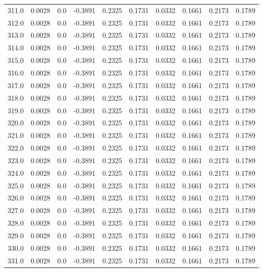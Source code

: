 \begin{longtable}{lrrrrrrrrr}
311.0 & 0.0028 & 0.0 & -0.3891 & 0.2325 & 0.1731 & 0.0332 & 0.1661 & 0.2173 & 0.1789 \\
312.0 & 0.0028 & 0.0 & -0.3891 & 0.2325 & 0.1731 & 0.0332 & 0.1661 & 0.2173 & 0.1789 \\
313.0 & 0.0028 & 0.0 & -0.3891 & 0.2325 & 0.1731 & 0.0332 & 0.1661 & 0.2173 & 0.1789 \\
314.0 & 0.0028 & 0.0 & -0.3891 & 0.2325 & 0.1731 & 0.0332 & 0.1661 & 0.2173 & 0.1789 \\
315.0 & 0.0028 & 0.0 & -0.3891 & 0.2325 & 0.1731 & 0.0332 & 0.1661 & 0.2173 & 0.1789 \\
316.0 & 0.0028 & 0.0 & -0.3891 & 0.2325 & 0.1731 & 0.0332 & 0.1661 & 0.2173 & 0.1789 \\
317.0 & 0.0028 & 0.0 & -0.3891 & 0.2325 & 0.1731 & 0.0332 & 0.1661 & 0.2173 & 0.1789 \\
318.0 & 0.0028 & 0.0 & -0.3891 & 0.2325 & 0.1731 & 0.0332 & 0.1661 & 0.2173 & 0.1789 \\
319.0 & 0.0028 & 0.0 & -0.3891 & 0.2325 & 0.1731 & 0.0332 & 0.1661 & 0.2173 & 0.1789 \\
320.0 & 0.0028 & 0.0 & -0.3891 & 0.2325 & 0.1731 & 0.0332 & 0.1661 & 0.2173 & 0.1789 \\
321.0 & 0.0028 & 0.0 & -0.3891 & 0.2325 & 0.1731 & 0.0332 & 0.1661 & 0.2173 & 0.1789 \\
322.0 & 0.0028 & 0.0 & -0.3891 & 0.2325 & 0.1731 & 0.0332 & 0.1661 & 0.2173 & 0.1789 \\
323.0 & 0.0028 & 0.0 & -0.3891 & 0.2325 & 0.1731 & 0.0332 & 0.1661 & 0.2173 & 0.1789 \\
324.0 & 0.0028 & 0.0 & -0.3891 & 0.2325 & 0.1731 & 0.0332 & 0.1661 & 0.2173 & 0.1789 \\
325.0 & 0.0028 & 0.0 & -0.3891 & 0.2325 & 0.1731 & 0.0332 & 0.1661 & 0.2173 & 0.1789 \\
326.0 & 0.0028 & 0.0 & -0.3891 & 0.2325 & 0.1731 & 0.0332 & 0.1661 & 0.2173 & 0.1789 \\
327.0 & 0.0028 & 0.0 & -0.3891 & 0.2325 & 0.1731 & 0.0332 & 0.1661 & 0.2173 & 0.1789 \\
328.0 & 0.0028 & 0.0 & -0.3891 & 0.2325 & 0.1731 & 0.0332 & 0.1661 & 0.2173 & 0.1789 \\
329.0 & 0.0028 & 0.0 & -0.3891 & 0.2325 & 0.1731 & 0.0332 & 0.1661 & 0.2173 & 0.1789 \\
330.0 & 0.0028 & 0.0 & -0.3891 & 0.2325 & 0.1731 & 0.0332 & 0.1661 & 0.2173 & 0.1789 \\
331.0 & 0.0028 & 0.0 & -0.3891 & 0.2325 & 0.1731 & 0.0332 & 0.1661 & 0.2173 & 0.1789 \\

\end{longtable}
